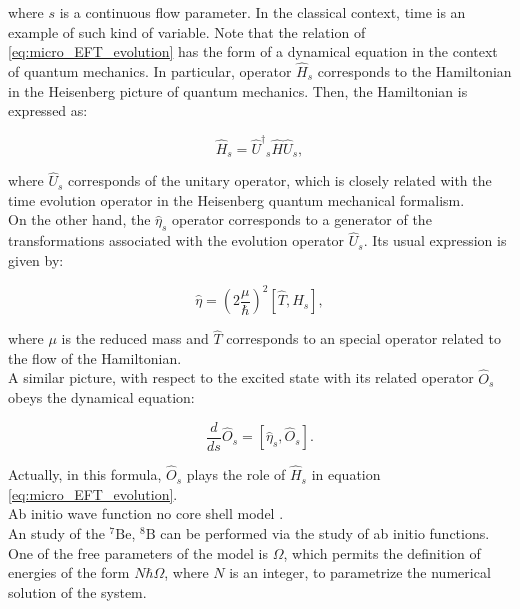 \documentclass[openany]{book}
\begin{document}
where $s$ is a continuous flow parameter. In the classical context, time is an example of such kind of variable. Note that the relation of \ref{eq:micro_EFT_evolution} has the form of a dynamical equation in the context of quantum mechanics. In particular, operator $\hat H_s$ corresponds to the Hamiltonian in the Heisenberg picture of quantum mechanics. Then, the Hamiltonian is expressed as: 

 \begin{equation}\label{eq:micro_EFT_hamiltonian_heisenberg}
	\hat H_s = {{\hat U}^{\dagger}}_s \hat H \hat U_s,
 \end{equation}

where $\hat U_s$ corresponds of the unitary operator, which is closely related with the time evolution operator in the Heisenberg quantum mechanical formalism. \\

On the other hand, the $\hat \eta_s$ operator corresponds to a generator of the transformations associated with the evolution operator  $\hat U_s$. Its usual expression is given by:
 
  \begin{equation}\label{eq:micro_EFT_hamiltonian_generator}
 	\hat \eta = \left(2 \frac{\mu }{\hbar}\right)^2 [\hat T, \hat H_s],
 \end{equation}

where $\mu$ is the reduced mass and $\hat T$ corresponds to an special operator related to the flow of the Hamiltonian.\\

A similar picture, with respect to the excited state with its related operator $\hat O_s$ obeys the dynamical equation: 

\begin{equation}\label{eq:micro_EFT_evolution_excited}
	\frac{d}{ds}\hat O_s = [\hat \eta_s, \hat O_s].
\end{equation}

Actually, in this formula, $\hat O_s$ plays the role of $\hat H_s$ in equation \ref{eq:micro_EFT_evolution}.\\
 
Ab initio wave function no core shell model \cite{navratil_bertulani_caurier_2006}. \\

An study of the $\mathrm{{}^{7}Be}$,  $\mathrm{{}^{8}B}$ can be performed via the study of ab initio functions. One of the free parameters of the model is $\Omega$, which permits the definition of energies of the form $N\hbar \Omega$, where $N$ is an integer, to parametrize the numerical solution of the system. \\
\end{document}
